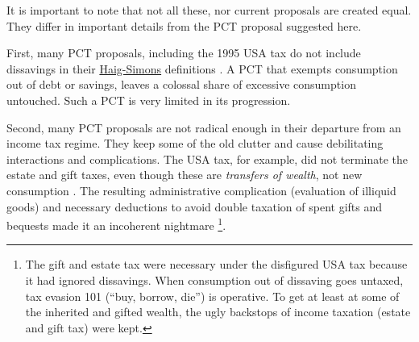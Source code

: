 


It is important to note that not all these, nor current proposals are created equal.
They differ in important details from the PCT proposal suggested here.

First, many PCT proposals, including the 1995 USA tax do not include dissavings in their \hyperref[eq:HaigSimonsPCT]{Haig-Simons} definitions \citep[18]{Bank2004}.
A PCT that exempts consumption out of debt or savings, leaves a colossal share of excessive consumption untouched.
Such a PCT is very limited in its progression.

Second, many PCT proposals are not radical enough in their departure from an income tax regime.
They keep some of the old clutter and cause debilitating interactions and complications.
The USA tax, for example, did not terminate the estate and gift taxes, even though these are \emph{transfers of wealth}, not new consumption \citep[19]{Bank2004}.
The resulting administrative complication (evaluation of illiquid goods) and necessary deductions to avoid double taxation of spent gifts and bequests made it an incoherent nightmare
\footnote{
	The gift and estate tax were necessary under the disfigured USA tax because it had ignored dissavings.
When consumption out of dissaving goes untaxed, tax evasion 101 (``buy, borrow, die'') is operative.
To get at least at some of the inherited and gifted wealth, the ugly backstops of income taxation (estate and gift tax) were kept.}.

